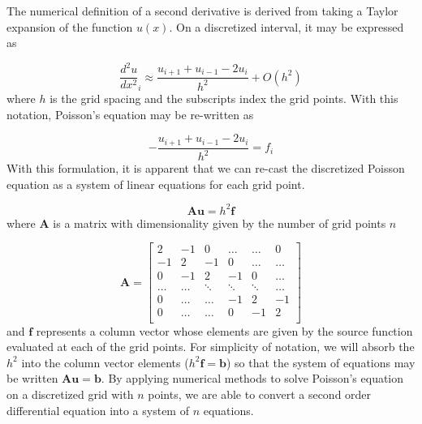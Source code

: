 \documentclass[10pt,showpacs,preprintnumbers,footinbib,amsmath,amssymb,aps,prl,twocolumn,groupedaddress,superscriptaddress,showkeys]{revtex4-1}
\newcommand{\deriv}[3][]{%
	\ensuremath{ \frac{d^{#1} {#2}}{d {#3}^{#1}} } }
\begin{document}
The numerical definition of a second derivative is derived from taking a Taylor expansion of the function $u(x)$.
On a discretized interval, it may be expressed as

\begin{equation*}
	\deriv[2]{u}{x} _i \approx \frac{u_{i+1} + u_{i-1} - 2u_i}{h^2} + O(h^2)
\end{equation*}
where $h$ is the grid spacing and the subscripts index the grid points. With this notation, Poisson's equation may be
re-written as

\begin{equation*}
	- \frac{u_{i+1} + u_{i-1} - 2u_i}{h^2} = f_i
\end{equation*}
With this formulation, it is apparent that we can re-cast the discretized Poisson equation as a system of linear equations
for each grid point.

\begin{equation*}
	\mathbf{A} \mathbf{u} = h^2 \mathbf{f}
\end{equation*}
where $\mathbf{A}$ is a matrix with dimensionality given by the number of grid points $n$

\begin{equation*}
    \mathbf{A} = \begin{bmatrix}
                           2& -1& 0 &\dots   & \dots &0 \\
                           -1 & 2 & -1 &0 &\dots &\dots \\
                           0&-1 &2 & -1 & 0 & \dots \\
                           \dots & \dots   & \ddots &\ddots &\ddots & \dots \\
                           0&\dots & \dots & -1 &2& -1 \\
                           0&\dots & \dots & 0  &-1 & 2 \\
                      \end{bmatrix}
\end{equation*}
and $\mathbf{f}$ represents a column vector whose elements are given by the source function
evaluated at each of the grid points. For simplicity of notation, we will absorb the $h^2$ into the
column vector elements ($h^2 \mathbf{f} = \mathbf{b}$) so that the system of equations may
be written $\mathbf{Au} = \mathbf{b}$. By applying numerical methods to solve Poisson's
equation on a discretized grid with $n$ points, we are able to convert a second order differential
equation into a system of $n$ equations.
\end{document}
